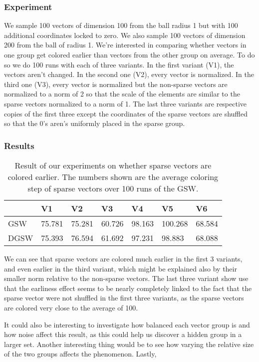 \documentclass[12pt]{article}
\begin{document}
\subsubsection{Experiment}
We sample 100 vectors of dimension 100 from the ball radius 1 but with 100 additional coordinates locked to zero. We also sample 100 vectors of dimension 200 from the ball of radius 1. We're interested in comparing whether vectors in one group get colored earlier than vectors from the other group on average. To do so we do 100 runs with each of three variants. In the first variant (V1), the vectors aren't changed. In the second one (V2), every vector is normalized. In the third one (V3), every vector is normalized but the non-sparse vectors are normalized to a norm of 2 so that the scale of the elements are similar to the sparse vectors normalized to a norm of 1. The last three variants are respective copies of the first three except the coordinates of the sparse vectors are shuffled so that the 0's aren's uniformly placed in the sparse group.

\subsubsection{Results}
\begin{center}
\begin{table}[h]
\begin{tabular}{l|llllll}
 &V1&V2&V3&V4&V5&V6\\
\hline
GSW&75.781&75.281&60.726&98.163&100.268&68.584\\
DGSW&75.393&76.594&61.692&97.231&98.883&68.088
\end{tabular}
\caption{Result of our experiments on whether sparse vectors are colored earlier. The numbers shown are the average coloring step of sparse vectors over 100 runs of the GSW.}
\label{pivot_longer}
\end{table}
\end{center}
We can see that sparse vectors are colored much earlier in the first 3 variants, and even earlier in the third variant, which might be explained also by their smaller norm relative to the non-sparse vectors. The last three variant show use that the earliness effect seems to be nearly completely linked to the fact that the sparse vector were not shuffled in the first three variants, as the sparse vectors are colored very close to the average of 100.

It could also be interesting to investigate how balanced each vector group is and how noise affect this result, as this could help us discover a hidden group in a larger set. Another interesting thing would be to see how varying the relative size of the two groups affects the phenomenon. Lastly, 
\end{document}
